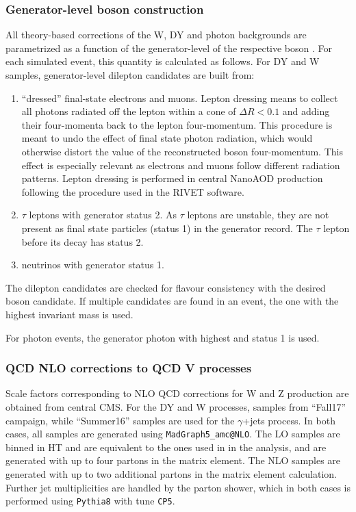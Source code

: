 \subsubsection{Generator-level boson construction}
All theory-based corrections of the W, DY and photon backgrounds are parametrized as a function of the generator-level \pt of the respective boson \ptv. For each simulated event, this quantity is calculated as follows. For DY and W samples, generator-level dilepton candidates are built from:

\begin{enumerate}
\item ``dressed'' final-state electrons and muons. Lepton dressing means to collect all photons radiated off the lepton within a cone of $\Delta R < 0.1$ and adding their four-momenta back to the lepton four-momentum. This procedure is meant to undo the effect of final state photon radiation, which would otherwise distort the value of the reconstructed boson four-momentum. This effect is especially relevant as electrons and muons follow different radiation patterns. Lepton dressing is performed in central NanoAOD production following the procedure used in the RIVET software.
\item $\tau$ leptons with generator status 2. As $\tau$ leptons are unstable, they are not present as final state particles (status 1) in the generator record. The $\tau$ lepton before its decay has status 2.
\item neutrinos with generator status 1.
\end{enumerate}

The dilepton candidates are checked for flavour consistency with the desired boson candidate. If multiple candidates are found in an event, the one with the highest invariant mass is used.

For photon events, the generator photon with highest \pt and status 1 is used.

\subsubsection{QCD NLO corrections to QCD V processes}

Scale factors corresponding to NLO QCD corrections for W and Z production are obtained from central CMS. For the DY and W processes, samples from ``Fall17'' campaign, while ``Summer16'' samples are used for the $\gamma$+jets process. In both cases, all samples are generated using \texttt{MadGraph5\_amc@NLO}. The LO samples are binned in HT and are equivalent to the ones used in in the analysis, and are generated with up to four partons in the matrix element. The NLO samples are generated with up to two additional partons in the matrix element calculation. Further jet multiplicities are handled by the parton shower, which in both cases is performed using \texttt{Pythia8} with tune \texttt{CP5}.


